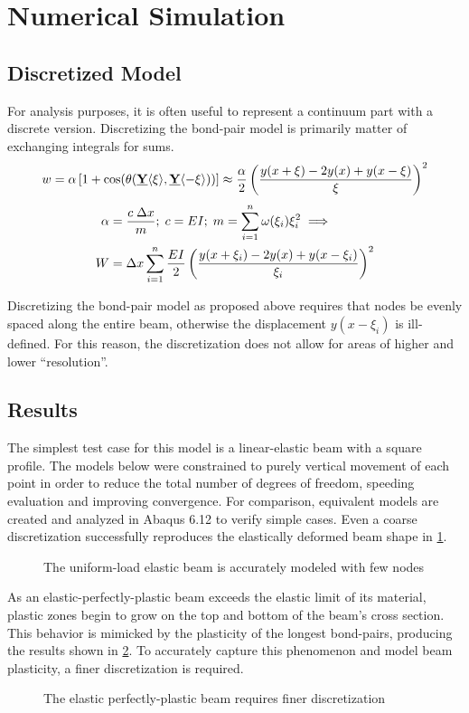 \documentclass[11pt]{amsart}
\newcommand{\plotpath}{./plots}
\newcommand\vstate[3]{%
	\mathbf{\underline{#1}}%
	\ifstrempty{#2}{}{[#2]}%
	\ifstrempty{#3}{}{\langle #3 \rangle}}
\begin{document}
\section{Numerical Simulation}
\subsection{Discretized Model}
For analysis purposes, it is often useful to represent a continuum part with a discrete version. 
Discretizing the bond-pair model is primarily matter of exchanging integrals for sums. 
%
\begin{align}
w = \alpha \left[1+\cos(\theta(\vstate{Y}{}{\xi},\vstate{Y}{}{\mathbf{-\xi}})) \right] \approx \frac{\alpha}{2}\left(\frac{y(x+\xi)-2y(x)+y(x-\xi)}{\xi}\right)^2 \notag
\end{align}
%
\begin{align}
\label{eq:discretebeam}
\alpha &= \frac{c\; \Delta x}{m} ;\; c= EI ;\; m=\sum_{i=1}^n \omega(\xi_i)\xi_i^2 \implies \nonumber \\
W&=\Delta x \sum_{i=1}^n \frac{EI}{2}\left(\frac{y(x+\xi_i)-2y(x)+y(x-\xi_i)}{\xi_i}\right)^2\notag
\end{align}
%

Discretizing the bond-pair model as proposed above requires that nodes be evenly spaced along the entire beam, otherwise the displacement \(y(x-\xi_i)\) is ill-defined. 
For this reason, the discretization does not allow for areas of higher and lower ``resolution''. 
\subsection{Results}
The simplest test case for this model is a linear-elastic beam with a square profile.
The models below were constrained to purely vertical movement of each point in order to reduce the total number of degrees of freedom, speeding evaluation and improving convergence.
For comparison, equivalent models are created and analyzed in Abaqus 6.12 to verify simple cases.
Even a coarse discretization successfully reproduces the elastically deformed beam shape in \cref{fig:eppt_g100}.

\begin{figure}[h]
  \centering
  \scalebox{.55}{}
  \caption{The uniform-load elastic beam is accurately modeled with few nodes}
  \label{fig:eppt_g100}
\end{figure}

As an elastic-perfectly-plastic beam exceeds the elastic limit of its material, plastic zones begin to grow on the top and bottom of the beam's cross section.
This behavior is mimicked by the plasticity of the longest bond-pairs, producing the results shown in \cref{fig:eppu_h10_g2000}.
To accurately capture this phenomenon and model beam plasticity, a finer discretization is required.
\begin{figure}[h]
  \centering
  \scalebox{.55}{}
  \caption{The elastic perfectly-plastic beam requires finer discretization}
  \label{fig:eppu_h10_g2000}
\end{figure}
\end{document}
